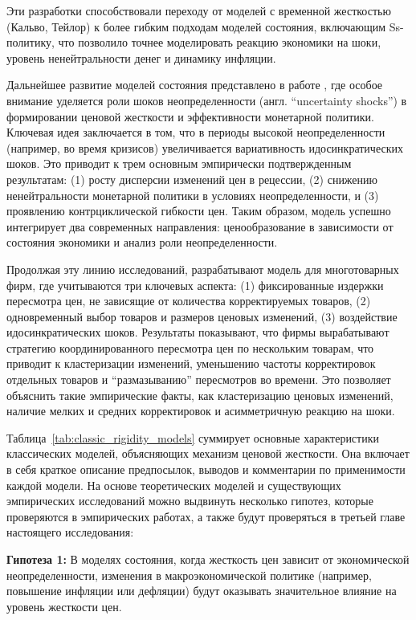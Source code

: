 Эти разработки способствовали переходу от моделей с временной жесткостью (Кальво, Тейлор) к более гибким подходам моделей состояния, включающим Ss-политику, что позволило точнее моделировать реакцию экономики на шоки, уровень ненейтральности денег и динамику инфляции.

Дальнейшее развитие моделей состояния представлено в работе \cite{vavra2012}, где особое внимание уделяется роли шоков неопределенности (англ. ``uncertainty shocks'') в формировании ценовой жесткости и эффективности монетарной политики. Ключевая идея заключается в том, что в периоды высокой неопределенности (например, во время кризисов) увеличивается вариативность идосинкратических шоков. Это приводит к трем основным эмпирически подтвержденным результатам: (1) росту дисперсии изменений цен в рецессии, (2) снижению ненейтральности монетарной политики в условиях неопределенности, и (3) проявлению контрциклической гибкости цен. Таким образом, модель успешно интегрирует два современных направления: ценообразование в зависимости от состояния экономики и анализ роли неопределенности.

Продолжая эту линию исследований, \cite{alvarez2014} разрабатывают модель для многотоварных фирм, где учитываются три ключевых аспекта: (1) фиксированные издержки пересмотра цен, не зависящие от количества корректируемых товаров, (2) одновременный выбор товаров и размеров ценовых изменений, (3) воздействие идосинкратических шоков. Результаты показывают, что фирмы вырабатывают стратегию координированного пересмотра цен по нескольким товарам, что приводит к кластеризации изменений, уменьшению частоты корректировок отдельных товаров и 
\enquote{размазыванию} пересмотров во времени. Это позволяет объяснить такие эмпирические факты, как кластеризацию ценовых изменений, наличие мелких и средних корректировок и асимметричную реакцию на шоки.

Таблица~\ref{tab:classic_rigidity_models} суммирует основные характеристики классических моделей, объясняющих механизм ценовой жесткости. Она включает в себя краткое описание предпосылок, выводов и комментарии по применимости каждой модели. На основе теоретических моделей и существующих эмпирических исследований можно выдвинуть несколько гипотез, которые проверяются в эмпирических работах, а также будут проверяться в третьей главе настоящего исследования:

\textbf{Гипотеза 1:} В моделях состояния, когда жесткость цен зависит от экономической неопределенности, изменения в макроэкономической политике (например, повышение инфляции или дефляции) будут оказывать значительное влияние на уровень жесткости цен.

